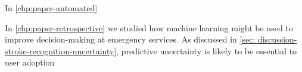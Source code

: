 



In \cref{chp:paper-automated} 

In \cref{chp:paper-retrospective} we studied how machine learning might be used to improve decision-making at emergency services. 
%
As discussed in \cref{sec: discussion-stroke-recognition-uncertainty}, predictive uncertainty is likely to be essential to user adoption


